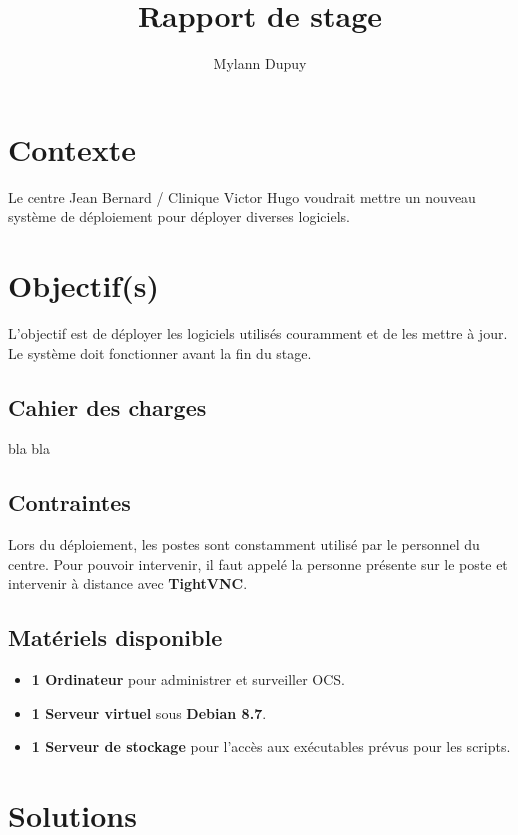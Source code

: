 \documentclass[11pt,a4paper,oneside]{article}
\author{Mylann Dupuy}
\title{Rapport de stage}
\begin{document}
\maketitle
\newpage
\tableofcontents
\newpage
\section{Contexte}
Le centre Jean Bernard / Clinique Victor Hugo voudrait mettre un nouveau système de d{\'e}ploiement pour d{\'e}ployer diverses logiciels.
\section{Objectif(s)}
L'objectif est de d{\'e}ployer les logiciels utilis{\'e}s couramment et de les mettre à jour. Le système doit fonctionner avant la fin du stage. 
\subsection{Cahier des charges}
bla bla
\\
\subsection{Contraintes}
Lors du d{\'e}ploiement, les postes sont constamment utilis{\'e} par le personnel du centre. Pour pouvoir intervenir, il faut appel{\'e} la personne pr{\'e}sente sur le poste et intervenir à distance avec \textbf{TightVNC}.
\subsection{Mat{\'e}riels disponible}
\begin{itemize}
	\item \textbf{1 Ordinateur} pour administrer et surveiller OCS.
	\item \textbf{1 Serveur virtuel} sous 	\textbf{Debian 8.7}.
	\item \textbf{1 Serveur de stockage}  pour l'accès aux ex{\'e}cutables pr{\'e}vus pour les scripts. 

\end{itemize}
\section{Solutions}
\end{document}
